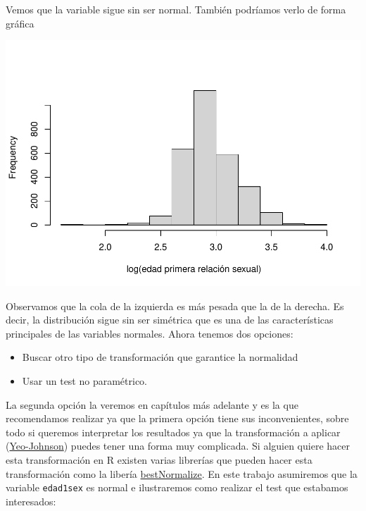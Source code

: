\documentclass[
]{book}
\newenvironment{Shaded}{\begin{snugshade}}{\end{snugshade}}
\newcommand{\AttributeTok}[1]{\textcolor[rgb]{0.77,0.63,0.00}{#1}}
\newcommand{\FunctionTok}[1]{\textcolor[rgb]{0.00,0.00,0.00}{#1}}
\newcommand{\NormalTok}[1]{#1}
\newcommand{\SpecialCharTok}[1]{\textcolor[rgb]{0.00,0.00,0.00}{#1}}
\newcommand{\StringTok}[1]{\textcolor[rgb]{0.31,0.60,0.02}{#1}}
\begin{document}
Vemos que la variable sigue sin ser normal. También podríamos verlo de forma gráfica

\begin{Shaded}
\end{Shaded}

\includegraphics{fig/unnamed-chunk-42-1.pdf}

Observamos que la cola de la izquierda es más pesada que la de la derecha. Es decir, la distribución sigue sin ser simétrica que es una de las características principales de las variables normales. Ahora tenemos dos opciones:

\begin{itemize}
\item
  Buscar otro tipo de transformación que garantice la normalidad
\item
  Usar un test no paramétrico.
\end{itemize}

La segunda opción la veremos en capítulos más adelante y es la que recomendamos realizar ya que la primera opción tiene sus inconvenientes, sobre todo si queremos interpretar los resultados ya que la transformación a aplicar (\href{https://en.wikipedia.org/wiki/Power_transform}{Yeo-Johnson}) puedes tener una forma muy complicada. Si alguien quiere hacer esta transformación en R existen varias librerías que pueden hacer esta transformación como la libería \href{https://cran.r-project.org/web/packages/bestNormalize/bestNormalize.pdf}{bestNormalize}. En este trabajo asumiremos que la variable \texttt{edad1sex} es normal e ilustraremos como realizar el test que estabamos interesados:
\end{document}
